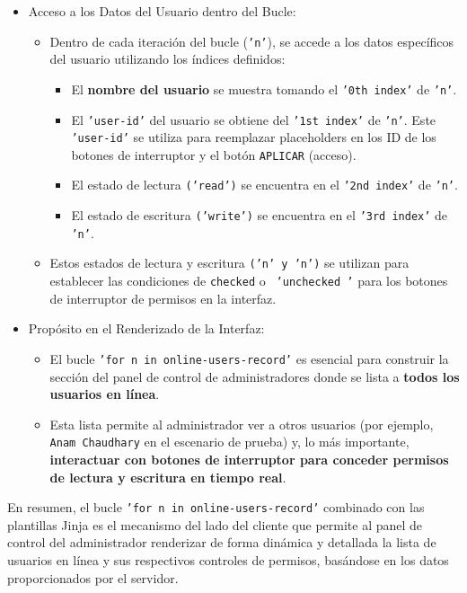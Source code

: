 \documentclass{report}
\begin{document}
\begin{itemize}
    \item Acceso a los Datos del Usuario dentro del Bucle:
    \begin{itemize}
        \item Dentro de cada iteración del bucle (\texttt{'n'}), se accede a los datos específicos del usuario utilizando los índices definidos:
        \begin{itemize}
            \item El \textbf{nombre del usuario} se muestra tomando el \texttt{'0th index'} de \texttt{'n'}.
            \item El \texttt{'user-id'} del usuario se obtiene del \texttt{'1st index'} de \texttt{'n'}. Este \texttt{'user-id'} se utiliza para 
            reemplazar placeholders en los ID de los botones de interruptor y el botón \texttt{APLICAR} (acceso).
            \item El estado de lectura \texttt{('read')} se encuentra en el \texttt{'2nd index'} de \texttt{'n'}.
            \item El estado de escritura \texttt{('write')} se encuentra en el \texttt{'3rd index'} de \texttt{'n'}.
        \end{itemize}
        \item Estos estados de lectura y escritura \texttt{('n' y 'n')} se utilizan para establecer las condiciones de \texttt{checked} o 
        \texttt{ 'unchecked '} para los botones de interruptor de permisos en la interfaz.    
    \end{itemize}

    \item Propósito en el Renderizado de la Interfaz:
    \begin{itemize}
        \item El bucle \texttt{'for n in online-users-record'} es esencial para construir la sección del panel de control de administradores donde se lista 
        a \textbf{todos los usuarios en línea}.
        \item Esta lista permite al administrador ver a otros usuarios (por ejemplo, \texttt{Anam Chaudhary} en el escenario de prueba) y, lo más 
        importante, \textbf{interactuar con botones de interruptor para conceder permisos de lectura y escritura en tiempo real}.    
    \end{itemize}
\end{itemize}

En resumen, el bucle \texttt{'for n in online-users-record'} combinado con las plantillas Jinja es el mecanismo del lado del cliente que permite 
al panel de control del administrador renderizar de forma dinámica y detallada la lista de usuarios en línea y sus respectivos controles de permisos, 
basándose en los datos proporcionados por el servidor.
\end{document}
